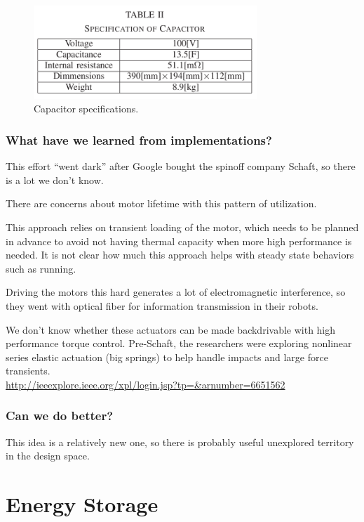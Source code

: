 \documentclass[letterpaper,12pt,fullpage]{article}
\begin{document}
\begin{figure}[h]
\centering
\includegraphics[width=0.75\textwidth]{tech-figs/s2}
\caption{Capacitor specifications.}
\label{f:s2}
\end{figure}

\subsubsection{What have we learned from implementations?}

This effort ``went dark'' after Google bought the spinoff company
Schaft, so there is a lot we don't know.

There are concerns about motor lifetime with this pattern of utilization.

This approach relies on transient loading of the motor, which needs
to be planned in advance to avoid not having thermal capacity
when more high performance is needed.
It is not clear how much this approach helps with 
steady state behaviors such as running.

Driving the motors this hard generates a lot of electromagnetic interference,
so they went with optical fiber for information transmission in their
robots.

We don't know whether these actuators can be made backdrivable with
high performance torque control. Pre-Schaft, the researchers were exploring
nonlinear series elastic actuation (big springs)
to help handle impacts and large force
transients.\\
\url{http://ieeexplore.ieee.org/xpl/login.jsp?tp=&arnumber=6651562}\\

\subsubsection{Can we do better?}

This idea is a relatively new one, so there is probably useful unexplored
territory in the design space.

\section{Energy Storage}
\end{document}
